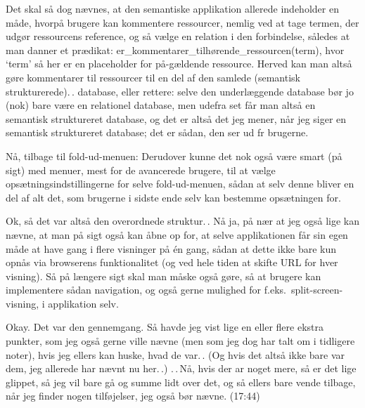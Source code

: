 \documentclass{report}
\begin{document}
Det skal så dog nævnes, at den semantiske applikation allerede indeholder en måde, hvorpå brugere kan kommentere ressourcer, nemlig ved at tage termen, der udgør ressourcens reference, og så vælge en relation i den forbindelse, således at man danner et prædikat: er\_kommentarer\_tilhørende\_ressourcen(term), hvor `term' så her er en placeholder for på-gældende ressource. Herved kan man altså gøre kommentarer til ressourcer til en del af den samlede (semantisk strukturerede).\,. database, eller rettere: selve den underlæggende database bør jo (nok) bare være en relationel database, men udefra set får man altså en semantisk struktureret database, og det er altså det jeg mener, når jeg siger en semantisk struktureret database; det er sådan, den ser ud fr brugerne. 


Nå, tilbage til fold-ud-menuen: Derudover kunne det nok også være smart (på sigt) med menuer, mest for de avancerede brugere, til at vælge opsætningsindstillingerne for selve fold-ud-menuen, sådan at selv denne bliver en del af alt det, som brugerne i sidste ende selv kan bestemme opsætningen for.

Ok, så det var altså den overordnede struktur.\,. Nå ja, på nær at jeg også lige kan nævne, at man på sigt også kan åbne op for, at selve applikationen får sin egen måde at have gang i flere visninger på én gang, sådan at dette ikke bare kun opnås via browserens funktionalitet (og ved hele tiden at skifte URL for hver visning). Så på længere sigt skal man måske også gøre, så at brugere kan implementere sådan navigation, og også gerne mulighed for f.eks.\ split-screen-visning, i applikation selv. 

Okay. Det var den gennemgang. Så havde jeg vist lige en eller flere ekstra punkter, som jeg også gerne ville nævne (men som jeg dog har talt om i tidligere noter), hvis jeg ellers kan huske, hvad de var.\,. (Og hvis det altså ikke bare var dem, jeg allerede har nævnt nu her.\,.) .\,.\,Nå, hvis der ar noget mere, så er det lige glippet, så jeg vil bare gå og summe lidt over det, og så ellers bare vende tilbage, når jeg finder nogen tilføjelser, jeg også bør nævne. (17:44)
\end{document}
